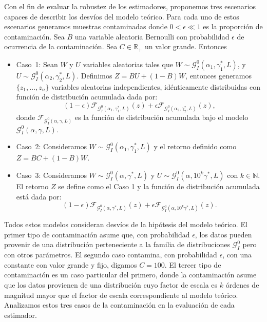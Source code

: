 Con el fin de evaluar la robustez de los estimadores, proponemos tres escenarios capaces de describir los desvíos del modelo teórico. Para cada uno de estos escenarios generamos muestras contaminadas donde $0<\epsilon \ll 1$ es la proporción de contaminación. 
Sea  $B$ una variable aleatoria Bernoulli con probabilidad $\epsilon$ de ocurrencia de la contaminación. Sea $C \in \mathbb R_+$ un valor grande. Entonces
\begin{itemize}
	\item \label{ContCaso1}Caso~1:
	Sean $W$ y $U$ variables aleatorias tales que $W \sim \mathcal{G}_I^0(\alpha_1,\gamma_1^*,L)$, y $U \sim \mathcal{G}_I^0(\alpha_2,\gamma_2^*,L) $. Definimos $Z=BU+(1-B)W$, entonces generamos $\{z_1,\dots,z_n\}$ variables aleatorias independientes, idénticamente distribuidas con función de distribución acumulada dada por:
	$$
	(1-\epsilon) \mathcal{F}_{\mathcal{G}_I^0(\alpha_1,\gamma_1^*,L)}(z)+\epsilon\mathcal{F}_{\mathcal{G}_I^0(\alpha_2,\gamma_2^*,L)}(z),
	$$
	donde $\mathcal{F}_{\mathcal{G}_I^0(\alpha,\gamma,L)}$ es la función de distribución acumulada bajo el modelo $\mathcal{G}_I^0(\alpha,\gamma,L)$.
	\item \label{Caso2}Caso~2: Consideramos $W \sim \mathcal{G}_I^0(\alpha_1,\gamma_1^*,L)$ y el retorno definido como $Z=BC+(1-B)W$.
	\item \label{Caso3}Caso~3:
	Consideramos $W \sim \mathcal{G}_I^0(\alpha,\gamma^*,L)$ y $U\sim \mathcal{G}_I^0(\alpha,10^k\gamma^*,L) $ con $k \in \mathbb{N}$. 
	El retorno $Z$ se define como el Caso 1 y la función de distribución acumulada está dada por: 
	$$
	(1-\epsilon) \mathcal{F}_{\mathcal{G}_I^0(\alpha,\gamma^*,L)}(z)+\epsilon\mathcal{F}_{\mathcal{G}_I^0(\alpha,10^k\gamma^*,L)}(z).
	$$
\end{itemize}

Todos estos modelos consideran desvíos de la hipótesis del modelo teórico. El primer tipo de contaminación asume que, con probabilidad $\epsilon$, los datos pueden provenir de una distribución perteneciente a la familia de distribuciones $\mathcal{G}_I^0$ pero con otros parámetros. El segundo caso contamina, con probabilidad $\epsilon$, con una constante con valor grande y fijo, digamos $C=100$. El tercer tipo de contaminación es un caso particular del primero, donde la contaminación asume que los datos provienen de una distribución cuyo factor de escala es $k$ órdenes de magnitud mayor que el factor de escala correspondiente al modelo teórico. Analizamos estos tres casos de la contaminación en la evaluación de cada estimador.

